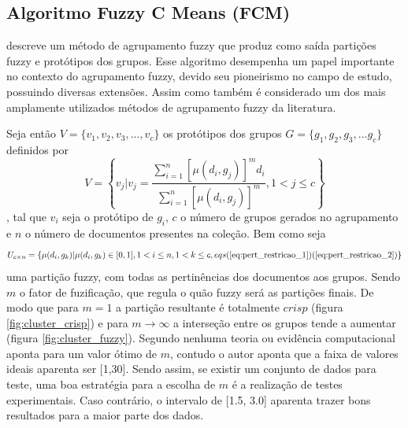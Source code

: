 \subsection{Algoritmo Fuzzy C Means (FCM)} \cite{Bezdek1984} descreve um método de agrupamento fuzzy
que produz como saída partições fuzzy e protótipos dos grupos. Esse algoritmo desempenha um papel
importante no contexto do agrupamento fuzzy, devido seu pioneirismo no campo de estudo, possuindo
diversas extensões. Assim como também é considerado um dos mais amplamente utilizados métodos de
agrupamento fuzzy da literatura\cite{Pal2005}.

Seja então $V = \{v_1,v_2,v_3,...,v_c\}$ os protótipos dos grupos $G = \{g_1,g_2,g_3,...g_c\}$
definidos por \begin{equation} V = \left\{ v_j | v_j = \frac{\sum_{i=1}^n[\mu(d_i,g_j)]^m
d_i}{\sum_{i=1}^n[\mu(d_i,g_j)]^m}, 1 < j \leq c \right\} \label{eq:prototipos} \end{equation} , tal
que $v_i$ seja o protótipo de $g_i$, $c$ o número de grupos gerados no agrupamento e $n$ o número de
documentos presentes na coleção. Bem como seja \begin{equation} U_{c \times n} = \{\mu(d_i, g_k) |
\mu(d_i, g_k) \in [0,1], 1 < i \leq n, 1 < k \leq c, eqs
(\ref{eq:pert_restricao_1})(\ref{eq:pert_restricao_2})\} \label{eq:part_fuzzy} \end{equation} uma
partição fuzzy, com todas as pertinências dos documentos aos grupos. Sendo $m$ o fator de
fuzificação, que regula o quão fuzzy será as partições finais. De modo que para $m = 1$ a partição
resultante é totalmente $crisp$ (figura \ref{fig:cluster_crisp}) e para $m \rightarrow \infty$ a
interseção entre os grupos tende a aumentar (figura
\ref{fig:cluster_fuzzy})\cite{Pal2005}\cite{Nogueira2013}. Segundo \cite{Bezdek1984} nenhuma teoria
ou evidência computacional aponta para um valor ótimo de $m$, contudo o autor aponta que a faixa de
valores ideais aparenta ser [1,30]. Sendo assim, se existir um conjunto de dados para teste, uma boa
estratégia para a escolha de $m$ é a realização de testes experimentais. Caso contrário, o intervalo
de [1.5, 3.0] aparenta trazer bons resultados para a maior parte dos dados.

